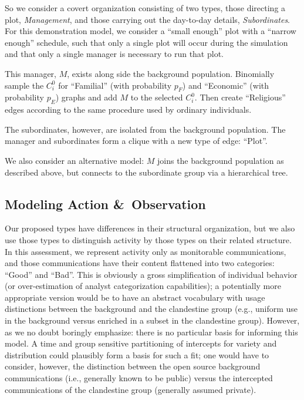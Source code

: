 \documentclass{article}
\begin{document}
So we consider a covert organization consisting of two types, those directing a plot, {\em Management}, and those carrying out the day-to-day details, {\em Subordinates}.  For this demonstration model, we consider a ``small enough'' plot with a ``narrow enough'' schedule, such that only a single plot will occur during the simulation and that only a single manager is necessary to run that plot.

This manager, $M$, exists along side the background population.  Binomially sample the $C_i^0$ for ``Familial'' (with probability $p_F$) and ``Economic'' (with probability $p_E$) graphs and add $M$ to the selected $C_i^0$.  Then create ``Religious'' edges according to the same procedure used by ordinary individuals.

The subordinates, however, are isolated from the background population.  The manager and subordinates form a clique with a new type of edge: ``Plot''.

We also consider an alternative model: $M$ joins the background population as described above, but connects to the subordinate group via a hierarchical tree.

\subsection*{Modeling Action \&\ Observation}
Our proposed types have differences in their structural organization, but we also use those types to distinguish activity by those types on their related structure.  In this assessment, we represent activity only as monitorable communications, and those communications have their content flattened into two categories: ``Good'' and ``Bad''.  This is obviously a gross simplification of individual behavior (or over-estimation of analyst categorization capabilities); a potentially more appropriate version would be to have an abstract vocabulary with usage distinctions between the background and the clandestine group (e.g., uniform use in the background versus enriched in a subset in the clandestine group).  However, as we no doubt boringly emphasize: there is no particular basis for informing this model.  A time and group sensitive partitioning of intercepts for variety and distribution could plausibly form a basis for such a fit; one would have to consider, however, the distinction between the open source background communications (i.e., generally known to be public) versus the intercepted communications of the clandestine group (generally assumed private).
\end{document}

